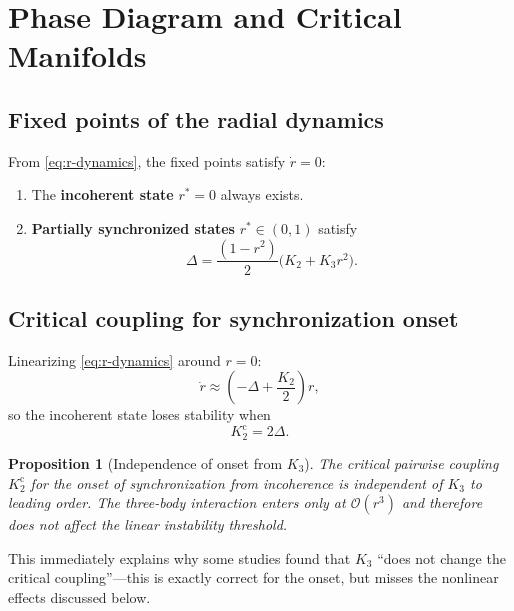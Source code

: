 \documentclass{article}
\newtheorem{proposition}{Proposition}
\newcommand{\Order}{\mathcal{O}}
\begin{document}
\section{Phase Diagram and Critical Manifolds}
\label{sec:phase-diagram}

\subsection{Fixed points of the radial dynamics}

From \eqref{eq:r-dynamics}, the fixed points satisfy $\dot{r}=0$:
\begin{enumerate}
  \item The \textbf{incoherent state} $r^*=0$ always exists.
  \item \textbf{Partially synchronized states} $r^*\in(0,1)$ satisfy
  \begin{equation}
    \Delta = \frac{(1-r^2)}{2}\bigl(K_2 + K_3 r^2\bigr).
    \label{eq:fp-condition}
  \end{equation}
\end{enumerate}

\subsection{Critical coupling for synchronization onset}

Linearizing \eqref{eq:r-dynamics} around $r=0$:
\begin{equation}
  \dot{r} \approx \left(-\Delta + \frac{K_2}{2}\right)r,
  \label{eq:linear-stability}
\end{equation}
so the incoherent state loses stability when
\begin{equation}
  \boxed{K_2^{\mathrm{c}} = 2\Delta.}
  \label{eq:Kc-onset}
\end{equation}

\begin{proposition}[Independence of onset from $K_3$]
\label{prop:onset-independence}
  The critical pairwise coupling $K_2^{\mathrm{c}}$ for the onset of
  synchronization from incoherence is independent of $K_3$ to leading order.
  The three-body interaction enters only at $\Order(r^3)$ and therefore does
  not affect the linear instability threshold.
\end{proposition}

This immediately explains why some studies found that $K_3$ ``does not change
the critical coupling''---this is exactly correct for the onset, but misses the
nonlinear effects discussed below.
\end{document}

